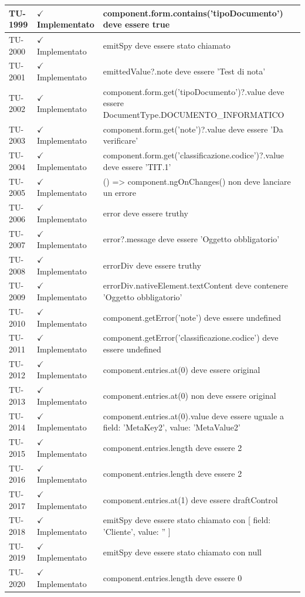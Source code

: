 ﻿\documentclass[a4paper,12pt]{article}
\newcommand{\ok}{\textcolor{green!60!black}{$\checkmark$ Implementato}}
\begin{document}
\begin{longtable}{|p{2cm}|p{3.5cm}|p{9.5cm}|}
\hline
TU-1999 & \ok & component.form.contains('tipoDocumento') deve essere true \\
\hline
TU-2000 & \ok & emitSpy deve essere stato chiamato \\
\hline
TU-2001 & \ok & emittedValue?.note deve essere 'Test di nota' \\
\hline
TU-2002 & \ok & component.form.get('tipoDocumento')?.value deve essere DocumentType.DOCUMENTO\_INFORMATICO \\
\hline
TU-2003 & \ok & component.form.get('note')?.value deve essere 'Da verificare' \\
\hline
TU-2004 & \ok & component.form.get('classificazione.codice')?.value deve essere 'TIT.1' \\
\hline
TU-2005 & \ok & () => component.ngOnChanges({}) non deve lanciare un errore \\
\hline
TU-2006 & \ok & error deve essere truthy \\
\hline
TU-2007 & \ok & error?.message deve essere 'Oggetto obbligatorio' \\
\hline
TU-2008 & \ok & errorDiv deve essere truthy \\
\hline
TU-2009 & \ok & errorDiv.nativeElement.textContent deve contenere 'Oggetto obbligatorio' \\
\hline
TU-2010 & \ok & component.getError('note') deve essere undefined \\
\hline
TU-2011 & \ok & component.getError('classificazione.codice') deve essere undefined \\
\hline
TU-2012 & \ok & component.entries.at(0) deve essere original \\
\hline
TU-2013 & \ok & component.entries.at(0) non deve essere original \\
\hline
TU-2014 & \ok & component.entries.at(0).value deve essere uguale a { field: 'MetaKey2', value: 'MetaValue2' } \\
\hline
TU-2015 & \ok & component.entries.length deve essere 2 \\
\hline
TU-2016 & \ok & component.entries.length deve essere 2 \\
\hline
TU-2017 & \ok & component.entries.at(1) deve essere draftControl \\
\hline
TU-2018 & \ok & emitSpy deve essere stato chiamato con [{ field: 'Cliente', value: '' }] \\
\hline
TU-2019 & \ok & emitSpy deve essere stato chiamato con null \\
\hline
TU-2020 & \ok & component.entries.length deve essere 0 \\

\end{longtable}
\end{document}
